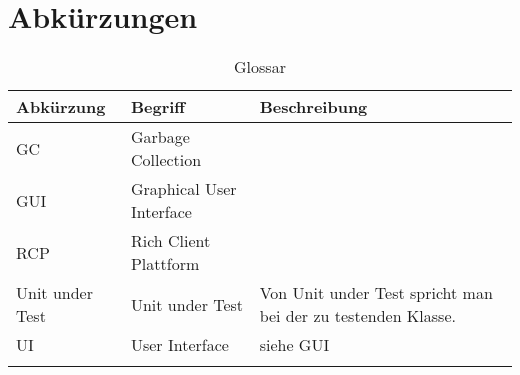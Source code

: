 \chapter*{Abkürzungen}\label{abkuerzungen}
  \begin{longtable}{|p{3cm}|p{5cm}|p{6cm}|}
\hline
  \textbf{Abkürzung} &\textbf{Begriff} &  \textbf{Beschreibung} \\\hline
  GC & Garbage Collection & \\\hline
GUI & Graphical User Interface & \\\hline
RCP & Rich Client Plattform \\\hline
Unit under Test & Unit under Test & Von Unit under Test spricht man bei der zu testenden Klasse.\\\hline
UI & User Interface & siehe GUI \\\hline
      \caption{Glossar}\\
  \end{longtable}



